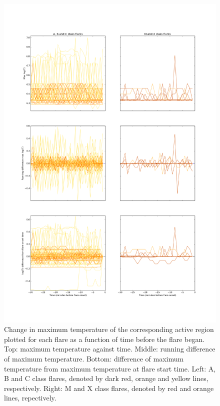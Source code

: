 \documentclass[referee,a4paper,12pt,traditabstract]{swsc}
\begin{document}
\begin{linenumbers}
\begin{figure}
	\centering
		\includegraphics[width=0.7\columnwidth]{tempplotsmax/allars.png}
	\caption{Change in maximum temperature of the corresponding active region plotted for each flare as a function of time before the flare began. Top: maximum temperature against time. Middle: running difference of maximum temperature. Bottom: difference of maximum temperature from maximum temperature at flare start time. Left: A, B and C class flares, denoted by dark red, orange and yellow lines, respectively. Right: M and X class flares, denoted by red and orange lines, repectively.}
	\label{fig:allars_max}
\end{figure}
\begin{figure}
	\centering

\end{figure}
\end{linenumbers}
\end{document}
